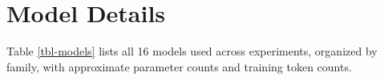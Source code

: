 \documentclass[11pt]{article}
\begin{document}
%
%
%
\raggedbottom
{}

\section{Model Details}\label{sec-appendix-models}

Table \ref{tbl-models} lists all 16 models used across experiments,
organized by family, with approximate parameter counts and training
token counts.

\begingroup\fontsize{9}{11}\selectfont
\end{document}
